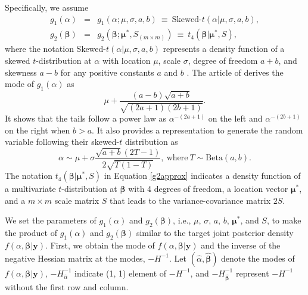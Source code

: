 \documentclass[article]{jss}
\begin{document}
Specifically, we assume
\begin{eqnarray}\label{env}
g_1(\alpha) &=& g_1(\alpha; \mu, \sigma, a, b)~\equiv~\textrm{Skewed-}t(\alpha\vert\mu, \sigma, a, b),\\
g_2(\boldsymbol{\beta}) &=& g_2(\boldsymbol{\beta}; \boldsymbol{\mu}^\ast, S_{(m\times m)})~\equiv~t_{4}(\boldsymbol{\beta}\vert \boldsymbol{\mu}^\ast, S),\label{g2approx}
\end{eqnarray}
where the notation Skewed-$t(\alpha\vert\mu, \sigma, a, b)$ represents a density function of a skewed $t$-distribution  at $\alpha$ with location $\mu$, scale $\sigma$, degree of freedom $a+b$, and skewness $a-b$ for any positive constants $a$ and $b$ \citep{jones2003skew}. The article of \cite{jones2003skew} derives the mode of $g_1(\alpha)$ as
\begin{equation}\label{mode}
\mu+\frac{(a-b)\sqrt{a+b}}{\sqrt{(2a+1)(2b+1)}}.
\end{equation} 
It shows that the tails follow a power law as $\alpha^{-(2a+1)}$ on the left and $\alpha^{-(2b+1)}$ on the right when $b>a$. It also provides a representation to generate the random variable following their skewed-$t$ distribution as
\begin{equation}
\alpha\sim \mu+\sigma\frac{\sqrt{a+b}(2T-1)}{2\sqrt{T(1-T)}}, ~\textrm{where}~ T\sim \textrm{Beta}(a, b).
\end{equation}
The notation $t_{4}(\boldsymbol{\beta}\vert\boldsymbol{\mu}^\ast, S)$ in Equation \ref{g2approx} indicates a density function of a multivariate $t$-distribution at $\boldsymbol{\beta}$ with 4 degrees of freedom, a location vector $\boldsymbol{\mu}^\ast$, and a $m\times m$ scale matrix $S$ that leads to the variance-covariance matrix $2S$. 

We set the parameters of $g_1(\alpha)$ and $g_2(\boldsymbol{\beta})$, i.e., $\mu$, $\sigma$, $a$, $b$, $\boldsymbol{\mu}^\ast$, and $S$, to make the product of $g_1(\alpha)$ and $g_2(\boldsymbol{\beta})$ similar to the target joint posterior density $f(\alpha, \boldsymbol{\beta} \vert  \boldsymbol{y})$. First, we obtain the  mode of $f(\alpha, \boldsymbol{\beta} \vert  \boldsymbol{y})$ and the inverse of the  negative Hessian matrix at the modes, $-H^{-1}$. Let $(\hat{\alpha}, \hat{\boldsymbol{\beta}})$ denote the modes of $f(\alpha, \boldsymbol{\beta} \vert  \boldsymbol{y})$, $-H^{-1}_{\hat{\alpha}}$ indicate (1, 1) element of $-H^{-1}$, and $-H^{-1}_{\hat{\boldsymbol{\beta}}}$ represent  $-H^{-1}$ without the first row and  column. 
\end{document}
